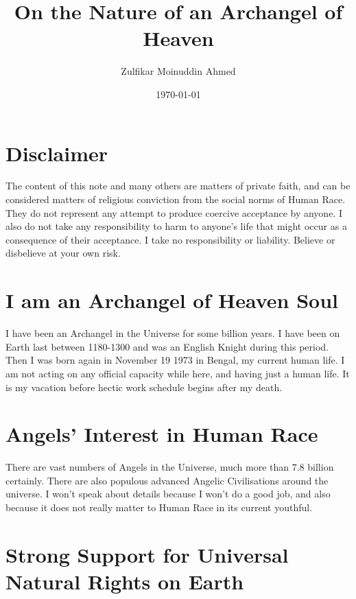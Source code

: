 \documentclass{amsart}
\title{On the Nature of an Archangel of Heaven}
\author{Zulfikar Moinuddin Ahmed}
\date{\today}
\begin{document}
\maketitle

\section{Disclaimer}
The content of this note and many others are matters of private faith, and can be considered matters of religious conviction from the social norms of Human Race.  They do not represent any attempt to produce coercive acceptance by anyone.  I also do not take any responsibility to harm to anyone's life that might occur as a consequence of their acceptance.  I take no responsibility or liability.  Believe or disbelieve at your own risk.

\section{I am an Archangel of Heaven Soul}
I have been an Archangel in the Universe for some billion years.  I have been on Earth last between 1180-1300 and was an English Knight during this period.  Then I was born again in November 19 1973 in Bengal, my current human life.  I am not acting on any official capacity while here, and having just a human life.  It is my vacation before hectic work schedule begins after my death.

\section{Angels' Interest in Human Race}

There are vast numbers of Angels in the Universe, much more than 7.8 billion certainly.  There are also populous advanced Angelic Civilisations around the universe.  I won't speak about details because I won't do a good job, and also because it does not really matter to Human Race in its current youthful. 

\section{Strong Support for Universal Natural Rights on Earth}
\end{document}
